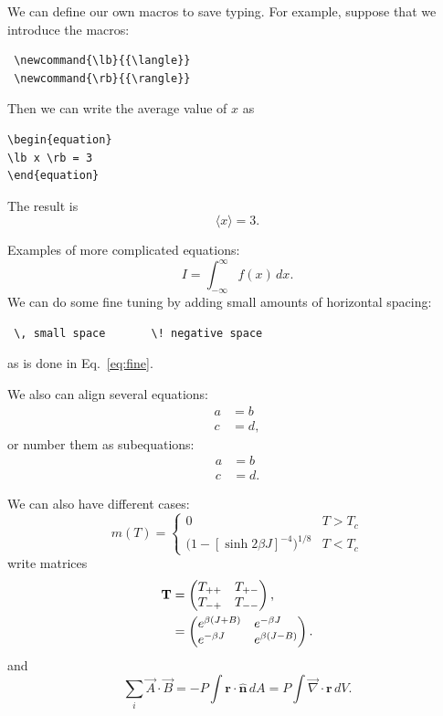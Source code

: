\documentclass[12pt]{article}
\begin{document}
We can define our own macros to save typing. For example, suppose that we introduce the macros:
\begin{verbatim}
 \newcommand{\lb}{{\langle}}
 \newcommand{\rb}{{\rangle}}
\end{verbatim}
\newcommand{\lb}{{\langle}}
\newcommand{\rb}{{\rangle}}
Then we can write the average value of $x$ as
\begin{verbatim}
\begin{equation}
\lb x \rb = 3
\end{equation}
\end{verbatim}
The result is
\begin{equation}
\lb x \rb = 3 .
\end{equation}

Examples of more complicated equations:
\begin{equation}
I = \! \int_{-\infty}^\infty f(x)\,dx \label{eq:fine}.
\end{equation}
We can do some fine tuning by adding small amounts of horizontal spacing:
\begin{verbatim}
 \, small space       \! negative space
\end{verbatim}
as is done in Eq.~\eqref{eq:fine}.

We also can align several equations:
\begin{align}
a & = b \\
c &= d ,
\end{align}
or number them as subequations:
\begin{subequations}
\begin{align}
a & = b \\
c &= d .
\end{align}
\end{subequations}

We can also have different cases:
\begin{equation}
\label{eq:mdiv}
m(T) =
\begin{cases}
0 & \text{$T > T_c$} \\
\bigl(1 - [\sinh 2 \beta J]^{-4} \bigr)^{\! 1/8} & \text{$T < T_c$}
\end{cases}
\end{equation}
write matrices
\begin{align}
\textbf{T} &=
\begin{pmatrix}
T_{++} \hfill & T_{+-} \\
T_{-+} & T_{--} \hfill 
\end{pmatrix} , \nonumber \\
& =
\begin{pmatrix}
e^{\beta (J + B)} \hfill & e^{-\beta J} \hfill \\
e^{-\beta J} \hfill & e^{\beta (J - B)} \hfill
\end{pmatrix}.
\end{align}
and 
\newcommand{\rv}{\textbf{r}}
\begin{equation}
\sum_i \vec A \cdot \vec B = -P\!\int\! \rv \cdot \hat{\mathbf{n}}\, dA = P\!\int \! {\vec \nabla} \cdot \rv\, dV.
\end{equation}
\end{document}
